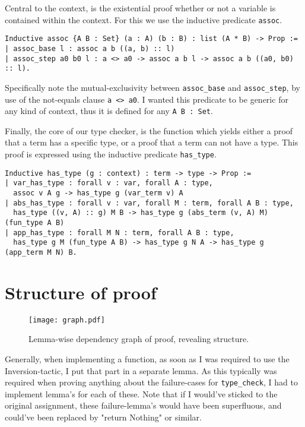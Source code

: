 \documentclass[a4paper, 10pt]{amsart}
\begin{document}
	Central to the context, is the existential proof whether or not a variable is contained within the context.
	For this we use the inductive predicate \lstinline{assoc}.
\begin{lstlisting}
Inductive assoc {A B : Set} (a : A) (b : B) : list (A * B) -> Prop :=
| assoc_base l : assoc a b ((a, b) :: l)
| assoc_step a0 b0 l : a <> a0 -> assoc a b l -> assoc a b ((a0, b0) :: l).
\end{lstlisting}
	Specifically note the mutual-exclusivity between \lstinline{assoc_base} and \lstinline{assoc_step}, by use of the not-equals clause \lstinline{a <> a0}.
	I wanted this predicate to be generic for any kind of context, thus it is defined for any \lstinline{A B : Set}.

	Finally, the core of our type checker, is the function which yields either a proof that a term has a specific type, or a proof that a term can not have a type.
	This proof is expressed using the inductive predicate \lstinline{has_type}.
\begin{lstlisting}
Inductive has_type (g : context) : term -> type -> Prop :=
| var_has_type : forall v : var, forall A : type,
  assoc v A g -> has_type g (var_term v) A
| abs_has_type : forall v : var, forall M : term, forall A B : type,
  has_type ((v, A) :: g) M B -> has_type g (abs_term (v, A) M) (fun_type A B)
| app_has_type : forall M N : term, forall A B : type,
  has_type g M (fun_type A B) -> has_type g N A -> has_type g (app_term M N) B.
\end{lstlisting}

	\section{Structure of proof}
	
	\begin{figure}[H]
		\texttt{[image: graph.pdf]}
		\caption{Lemma-wise dependency graph of proof, revealing structure.}
	\end{figure}
	
	Generally, when implementing a function, as soon as I was required to use the Inversion-tactic, I put that part in a separate lemma.
	As this typically was required when proving anything about the failure-cases for \lstinline{type_check}, I had to implement lemma's for each of these.
	Note that if I would've sticked to the original assignment, these failure-lemma's would have been superfluous, and could've been replaced by "return Nothing" or similar.
\end{document}
